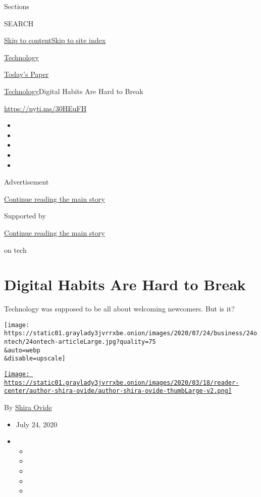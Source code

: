 Sections

SEARCH

\protect\hyperlink{site-content}{Skip to
content}\protect\hyperlink{site-index}{Skip to site index}

\href{https://www.nytimes3xbfgragh.onion/section/technology}{Technology}

\href{https://myaccount.nytimes3xbfgragh.onion/auth/login?response_type=cookie\&client_id=vi}{}

\href{https://www.nytimes3xbfgragh.onion/section/todayspaper}{Today's
Paper}

\href{/section/technology}{Technology}\textbar{}Digital Habits Are Hard
to Break

\url{https://nyti.ms/30HEuFH}

\begin{itemize}
\item
\item
\item
\item
\item
\end{itemize}

Advertisement

\protect\hyperlink{after-top}{Continue reading the main story}

Supported by

\protect\hyperlink{after-sponsor}{Continue reading the main story}

on tech

\hypertarget{digital-habits-are-hard-to-break}{%
\section{Digital Habits Are Hard to
Break}\label{digital-habits-are-hard-to-break}}

Technology was supposed to be all about welcoming newcomers. But is it?

\texttt{[image: https://static01.graylady3jvrrxbe.onion/images/2020/07/24/business/24ontech/24ontech-articleLarge.jpg?quality=75\\\&auto=webp\\\&disable=upscale]}

\href{https://www.nytimes3xbfgragh.onion/by/shira-ovide}{\texttt{[image: https://static01.graylady3jvrrxbe.onion/images/2020/03/18/reader-center/author-shira-ovide/author-shira-ovide-thumbLarge-v2.png]}}

By \href{https://www.nytimes3xbfgragh.onion/by/shira-ovide}{Shira Ovide}

\begin{itemize}
\item
  July 24, 2020
\item
  \begin{itemize}
  \item
  \item
  \item
  \item
  \item
  \end{itemize}
\end{itemize}

